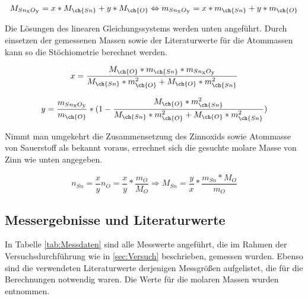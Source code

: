 \documentclass{article}
\begin{document}
      \begin{equation}
        M_{Sn\textsubscript{x}O\textsubscript{y}} = x * M_{\ch{Sn}} + y * M_{\ch{O}}  \Leftrightarrow m_{Sn\textsubscript{x}O\textsubscript{y}} = x * m_{\ch{Sn}} + y * m_{\ch{O}} \label{eq:Molmasse}
      \end{equation} 
      
      Die Lösungen des linearen Gleichungssystems werden unten angeführt. Durch einsetzen der gemessenen Massen sowie der Literaturwerte für die Atommassen kann so die Stöchiometrie berechnet werden. 
      
      \begin{equation}
        x = \frac{M_{\ch{O}} * m_{\ch{Sn}} * m_{Sn\textsubscript{x}O\textsubscript{y}}}{M_{\ch{Sn}} * m_{\ch{O}}^2 + M_{\ch{O}} * m_{\ch{Sn}}^2} \label{eq:x}
      \end{equation}
      
      \begin{equation}
        y = \frac{m_{Sn\textsubscript{x}O\textsubscript{y}}}{m_{\ch{O}}} * (1 - \frac{M_{\ch{O}} * m_{\ch{Sn}}^2}{M_{\ch{Sn}} * m_{\ch{O}}^2 + M_{\ch{O}} * m_{\ch{Sn}}^2}) \label{eq:y}
      \end{equation}
      
      Nimmt man umgekehrt die Zusammensetzung des Zinnoxids sowie Atommasse von Sauerstoff als bekannt voraus, errechnet sich die gesuchte molare Masse von Zinn wie unten angegeben.
      
      \begin{equation}
        n_{Sn} = \frac{x}{y}n_{O} = \frac{x}{y} * \frac{m_{O}}{M_{O}} \Rightarrow M_{Sn} = \frac{y}{x} * \frac{m_{Sn}*M_{O}}{m_{O}} \label{eq:Mol}
      \end{equation}
      
    \subsection{Messergebnisse und Literaturwerte}
    
      In Tabelle \ref{tab:Messdaten} sind alle Messwerte angeführt, die im Rahmen der Versuchsdurchführung wie in \ref{sec:Versuch} beschrieben, gemessen wurden. Ebenso sind die verwendeten Literaturwerte derjenigen Messgrößen aufgelistet, die für die Berechnungen notwendig waren. Die Werte für die molaren Massen wurden \cite{Atommassentabelle} entnommen. 
      
\end{document}
